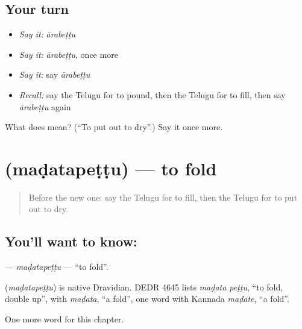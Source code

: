 \subsection*{Your turn}
\begin{itemize}
\raggedright
  \item \emph{Say it:} \emph{ārabeṭṭu}
  \item \emph{Say it:} \emph{ārabeṭṭu}, once more
  \item \emph{Say it:} say \emph{ārabeṭṭu}
  \item \emph{Recall:} say the Telugu for to pound, then the Telugu for to fill, then say \emph{ārabeṭṭu} again
\end{itemize}

\begin{tcolorbox}[breakable,colback=teal!4,colframe=teal!35!black,title={Before you move on}]
What does  mean? (\textquotedblleft{}To put out to dry\textquotedblright{}.) Say it once more.
\end{tcolorbox}
\section[\texorpdfstring{\te{మడతపెట్టు} (maḍatapeṭṭu)}{మడతపెట్టు (maḍatapeṭṭu)}]{ (maḍatapeṭṭu) — to fold}

\label{lesson:TE-C199-madatapettu}



\begin{quote}
Before the new one: say the Telugu for to fill, then the Telugu for to put out to dry.
\end{quote}

\subsection*{You'll want to know: }
\textbf{} — \emph{maḍatapeṭṭu} — \textquotedblleft{}to fold\textquotedblright{}.

\begin{cousinweb}
\textbf{} (\emph{maḍatapeṭṭu}) is native Dravidian. DEDR 4645 lists \emph{maḍata peṭṭu}, \textquotedblleft{}to fold, double up\textquotedblright{}, with \emph{maḍata}, \textquotedblleft{}a fold\textquotedblright{}, one word with Kannada \emph{maḍate}, \textquotedblleft{}a fold\textquotedblright{}.
\end{cousinweb}

\begin{grammarlens}[title={What you've built}]
One more word for this chapter.
\end{grammarlens}

